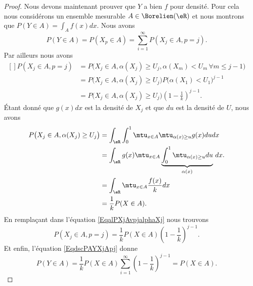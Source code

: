 \begin{proof}
    Nous devons maintenant prouver que \( Y\) a bien \( f\) pour densité. Pour cela nous considérons un ensemble mesurable \( A\in\Borelien(\eR)\) et nous montrons que \( P(Y\in A)=\int_Af(x)dx\). Nous avons
    \begin{equation}    \label{EqdscPAYXjApj}
        P(Y\in A)=P(X_p\in A)=\sum_{i=1}^{\infty}P(X_j\in A,p=j).
    \end{equation}
    Par ailleurs nous avons
    \begin{equation}        \label{EqalPXjAvpjalphaXj}
        \begin{aligned}[]
            P(X_j\in A,p=j)&=P\big( X_j\in A,\alpha(X_j)\geq U_j,\alpha(X_m)<U_m\,\forall m\leq j-1 \big)\\
            &=P\big( X_j\in A,\alpha(X_j)\geq U_j \big)P\big( \alpha(X_1)<U_1 \big)^{j-1}\\
            &=P\big( X_j\in A,\alpha(X_j)\geq U_j \big)\left( 1-\frac{1}{ k } \right)^{j-1}.
        \end{aligned}
    \end{equation}
    Étant donné que \( g(x)dx\) est la densité de \( X_j\) et que \( du\) est la densité de \( U\), nous avons
    \begin{subequations}
        \begin{align}
        P\big( X_j\in A,\alpha(X_j)\geq U_j \big)&=\int_{\eR}\int_0^1\mtu_{x\in A}\mtu_{\alpha(x)\geq u}g(x)dudx\\
        &=\int_{\eR}g(x)\mtu_{x\in A}\underbrace{\int_0^1\mtu_{\alpha(x)\geq u}du}_{\alpha(x)}\,dx.\\
        &=\int_{\eR}\mtu_{x\in A}\frac{ f(x) }{ k }dx\\
        &=\frac{1}{ k }P(X\in A).
        \end{align}
    \end{subequations}
    En remplaçant dans l'équation \eqref{EqalPXjAvpjalphaXj} nous trouvons
    \begin{equation}
        P(X_j\in A,p=j)=\frac{1}{ k }P(X\in A)\left( 1-\frac{1}{ k } \right)^{j-1}.
    \end{equation}
    Et enfin, l'équation \eqref{EqdscPAYXjApj} donne
    \begin{equation}
        P(Y\in A)=\frac{1}{ k }P(X\in A)\sum_{i=1}^{\infty}\left( 1-\frac{1}{ k } \right)^{j-1}=P(X\in A).
    \end{equation}
\end{proof}

